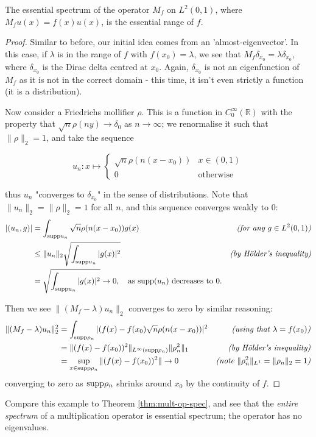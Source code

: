 \documentclass[../main.tex]{subfiles}
\begin{document}
\begin{example}
The essential spectrum of the operator $M_f$ on $L^2(0, 1)$, where $M_f u(x) = f(x)u(x)$, is the essential range of $f$.
\end{example}
\begin{proof}
Similar to before, our initial idea comes from an 'almost-eigenvector'. In this case, if $\lambda$ is in the range
of $f$ with $f(x_0) = \lambda$, we see that $M_f \delta_{x_0} = \lambda \delta_{x_0}$, where $\delta_{x_0}$ is the
Dirac delta centred at $x_0$. Again, $\delta_{x_0}$ is not an eigenfunction of $M_f$ as it is not in the correct domain - this time, 
it isn't even strictly a function (it is a distribution).

Now consider a Friedrichs mollifier $\rho$. This is a function in $C^\infty_0(\mathbb{R})$ with the property that $\sqrt{n}\rho(ny) \rightarrow \delta_0$ as $n \rightarrow \infty$; we renormalise it such that $\|\rho\|_2 = 1$, and take the sequence 

$$u_n: x \mapsto 
\begin{cases}
  \sqrt{n}\rho(n(x-x_0)) & x \in (0, 1) \\
  0 & \text{otherwise}
\end{cases}
$$

thus $u_n$ "converges to $\delta_{x_0}$" in the sense of distributions. Note that $\|u_n\|_2 = \|\rho\|_2 = 1$ for all $n$, and this sequence converges weakly to 0:
\begin{align*}
|( u_n, g )| & = \int_{\mathrm{supp}{u_n}}\sqrt{n}\rho(n(x-x_0))g(x) & \text{\emph{(for any $g \in L^2(0, 1)$)}} \\
& \leq \|u_n\|_2 \sqrt{\int_{\mathrm{supp}{u_n}} |g(x)|^2} & \text{\emph{(by H\"older's inequality)}} \\
& = \sqrt{\int_{\mathrm{supp}{u_n}} |g(x)|^2} \rightarrow 0, \quad \text{as $\mathrm{supp}(u_n)$ decreases to 0.} &
\end{align*}

Then we see $\|(M_f - \lambda)u_n\|_2$ converges to zero by similar reasoning:
\begin{align*}
\|(M_f - \lambda)u_n\|^2_2 & = \int_{\mathrm{supp} \rho_n} |(f(x) - f(x_0) \sqrt{n} \rho(n(x-x_0))|^2 & \text{\emph{(using that $\lambda = f(x_0)$)}} \\
& = \|(f(x) - f(x_0))^2\|_{L^\infty (\mathrm{supp} \rho_n)} \|\rho_n^2\|_1 & \text{\emph{(by H\"older's inequality)}} \\
& = \sup_{x \in \mathrm{supp} \rho_n} \|(f(x) - f(x_0))^2\| \rightarrow 0 & \text{\emph{(note $\|\rho_n^2\|_{L^1} = \|\rho_n\|_2 = 1$)}} \\
\end{align*}
converging to zero as $\mathrm{supp} \rho_n$ shrinks around $x_0$ by the continuity of $f$.
\end{proof}
Compare this example to Theorem \ref{thm:mult-op-spec}, and see that the \emph{entire spectrum} of a multiplication operator is essential spectrum; the
operator has no eigenvalues.
\end{document}
